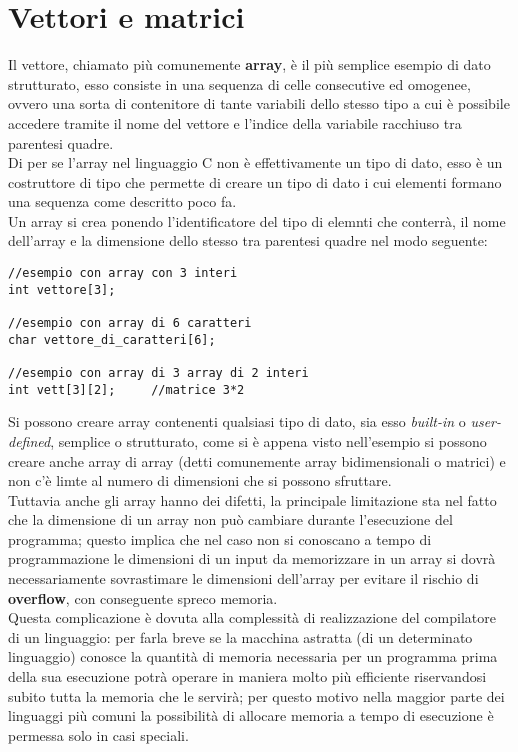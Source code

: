 \chapter{Vettori e matrici}

Il vettore, chiamato più comunemente \textbf{array}, è il più semplice esempio di dato strutturato, esso consiste in una sequenza di celle consecutive ed omogenee, ovvero una sorta di contenitore di tante variabili dello stesso tipo a cui è possibile accedere tramite il nome del vettore e l’indice della variabile racchiuso tra parentesi quadre.\\
Di per se l'array nel linguaggio C non è effettivamente un tipo di dato, esso è un costruttore di tipo che permette di creare un tipo di dato i cui elementi formano una sequenza come descritto poco fa. \\
Un array si crea ponendo l'identificatore del tipo di elemnti che conterrà, il nome dell'array e la dimensione dello stesso tra parentesi quadre nel modo seguente:
\begin{lstlisting}[title={Implementazione di un array}]
//esempio con array con 3 interi
int vettore[3];

//esempio con array di 6 caratteri
char vettore_di_caratteri[6];

//esempio con array di 3 array di 2 interi
int vett[3][2];		//matrice 3*2
\end{lstlisting}
Si possono creare array contenenti qualsiasi tipo di dato, sia esso \textit{built-in} o \textit{user-defined}, semplice o strutturato, come si è appena visto nell'esempio si possono creare anche array di array (detti comunemente array bidimensionali o matrici) e non c'è limte al numero di dimensioni che si possono sfruttare. \\
Tuttavia anche gli array hanno dei difetti, la principale limitazione sta nel fatto che la dimensione di un array non può cambiare durante l'esecuzione del programma; questo implica che nel caso non si conoscano a tempo di programmazione le dimensioni di un input da memorizzare in un array si dovrà necessariamente sovrastimare le dimensioni dell'array per evitare il rischio di \textbf{overflow}, con conseguente spreco memoria.\\ 
Questa complicazione è dovuta alla complessità di realizzazione del compilatore di un linguaggio: per farla breve se la macchina astratta (di un determinato linguaggio) conosce la quantità di memoria necessaria per un programma prima della sua esecuzione 
potrà operare in maniera molto più efficiente riservandosi subito tutta la memoria che le servirà; per questo motivo nella maggior parte dei linguaggi più comuni la possibilità di allocare memoria a tempo di esecuzione è permessa solo in casi speciali.\\
